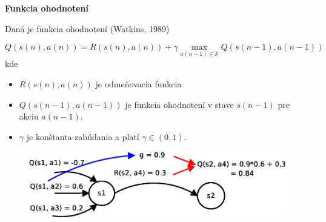 \documentclass[xcolor=dvipsnames]{beamer}
\begin{document}
\begin{frame}{\bf Funkcia ohodnotení}

Daná je funkcia ohodnotení (Watkins, 1989)

\begin{equation}
Q(s(n),a(n)) = R(s(n),a(n)) + \gamma \max_{a(n-1) \in \mathbb{A}} Q(s(n-1), a(n-1)) \nonumber
\label{eq:q_learning}
\end{equation}
kde \\

\begin{itemize}
 \item $R(s(n),a(n))$ je odmeňovacia funkcia \\
 \item $Q(s(n-1),a(n-1))$ je funkcia ohodnotení v stave $s(n-1)$ pre akciu $a(n-1)$, \\
 \item $\gamma$ je konštanta zabúdania a platí $\gamma \in (0, 1)$.
\end{itemize}

\begin{figure}[!htb]
\includegraphics[scale=.4]{../diagrams/q_learning_detail.eps}
\end{figure}

\end{frame}
\end{document}
